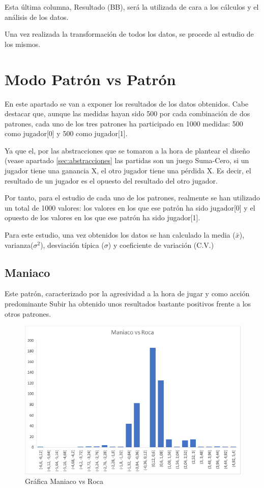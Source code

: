 Esta última columna, Resultado (BB), será la utilizada de cara a los cálculos y el análisis de los datos.

Una vez realizada la transformación de todos los datos, se procede al estudio de los mismos.

\section{Modo Patrón vs Patrón}
\label{sec:pvp}

En este apartado se van a exponer los resultados de los datos obtenidos. Cabe destacar que, aunque las medidas hayan sido 500 por cada combinación de dos patrones, cada uno de los tres patrones ha participado en 1000 medidas: 500 como jugador[0] y 500 como jugador[1].

Ya que el, por las abstracciones que se tomaron a la hora de plantear el diseño (vease apartado \ref{sec:abstracciones} las partidas son un juego Suma-Cero, si un jugador tiene una ganancia X, el otro jugador tiene una pérdida X. Es decir, el resultado de un jugador es el opuesto del resultado del otro jugador.

Por tanto, para el estudio de cada uno de los patrones, realmente se han utilizado un total de 1000 valores: los valores en los que ese patrón ha sido jugador[0] y el opuesto de los valores en los que ese patrón ha sido jugador[1].

Para este estudio, una vez obtenidos los datos se han calculado la media ($\bar{x}$), varianza($\sigma^2$), desviación típica ($\sigma$) y coeficiente de variación (C.V.)

\subsection{Maniaco}

Este patrón, caracterizado por la agresividad a la hora de jugar y como acción predominante Subir ha obtenido unos resultados bastante positivos frente a los otros patrones.



\begin{figure}[h]
\centering
\includegraphics[width=.65\textwidth]{figuras/MvR.png}   
\caption{Gráfica Maniaco vs Roca}
\label{fig:MvR}
\end{figure}

